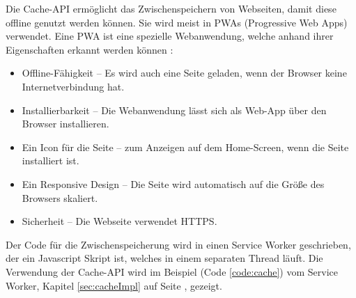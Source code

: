 \label{sec:cache}

Die Cache-API ermöglicht das Zwischenspeichern von Webseiten, damit diese offline genutzt werden können.
Sie wird meist in PWAs (Progressive Web Apps) verwendet. Eine PWA ist eine spezielle Webanwendung, welche anhand ihrer Eigenschaften erkannt werden können \cite{datacodedesignPWA}:
\begin{itemize}
    \item Offline-Fähigkeit -- Es wird auch eine Seite geladen, wenn der Browser keine Internetverbindung hat.
    \item Installierbarkeit -- Die Webanwendung lässt sich als Web-App über den Browser installieren.
    \item Ein Icon für die Seite -- zum Anzeigen auf dem Home-Screen, wenn die Seite installiert ist.
    \item Ein Responsive Design -- Die Seite wird automatisch auf die Größe des Browsers skaliert.
    \item Sicherheit -- Die Webseite verwendet HTTPS.
\end{itemize}

Der Code für die Zwischenspeicherung wird in einen Service Worker geschrieben, der ein Javascript Skript ist, welches in einem separaten Thread läuft. 
Die Verwendung der Cache-API wird im Beispiel (Code \ref{code:cache}) vom Service Worker, Kapitel \ref{sec:cacheImpl} auf Seite \pageref{code:cache}, gezeigt.